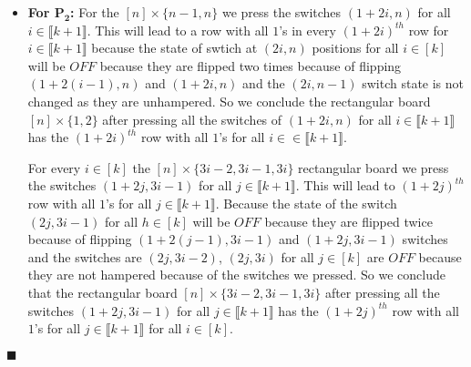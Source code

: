 \documentclass[a4paper, 11pt]{article}
\renewenvironment{proof}{\noindent{\it \textbf{Proof:}}\hspace*{1em}}{\hfill $\blacksquare$\bigskip\\}
\begin{document}
{\begin{proof}
\begin{itemize}
		For every $i\in[k]$ the $[n]\times \{3i,3i+1,3i+2\}$ rectangular board we press the switches $(1+2j,3i+1)$ for all $j\in\llbracket k+1\rrbracket$. This will lead to $({1+2j})^{th}$ row with all $1$'s for all $j\in\llbracket k+1\rrbracket$. Because the state of the switch $(2j,3i+1)$ for all $h\in[k]$ will be $OFF$ because they are flipped twice because of flipping $(1+2(j-1),3i+1)$ and $(1+2j,3i+1)$ switches and the switches are $(2j,3i)$, $(2j,3i+2)$ for all $j\in[k]$ are $OFF$ because they are not hampered because of the switches we pressed. So we conclude that the rectangular board $[n]\times \{3i,3i+1,3i+2\}$ after pressing all the switches  $(1+2j,3i+1)$ for all $j\in\llbracket k+1\rrbracket$ has  the $({1+2j})^{th}$ row with all $1$'s for all $j\in\llbracket k+1\rrbracket$ for all $i\in[k]$.
		
		Flipping a switch in one of the member of $P_1$ doesn't hamper another member because for switches on left or right edge horizontally it just one neighbor at right or left side respectively and for switches in the $n\times 3$ board we are pressing some switches in the middle column. So they don't have effect on each other.  Therefore after in the $n\times n$ board if we press the switches $$S_1=\{(1+2j,1),(1+2j,3i+1)\colon i\in\llbracket k+1\rrbracket,\ j\in[k]\}$$ will lead to $(1+2j)^{th}$ row with all $1$'s for all $j\in\llbracket k+1\rrbracket$. Therefore we have $$\sum_{j=0}^{k+1}\lt[A_{1+2j,1}+ \sum_{i=1}^kA_{1+2j,3i+1}\rt]=J$$
		
		
		\item  \textbf{For $\boldsymbol{P_2}$:} For the $[n]\times \{n-1,n\}$ we press the switches $(1+2i,n)$ for all $i\in\llbracket k+1\rrbracket$. This will lead to a row with all $1$'s in every $(1+2i)^{th}$ row for $i\in\llbracket k+1\rrbracket$ because the state of swtich at $(2i,n)$ positions for all $i\in[k]$ will be $OFF$ because they are flipped two times because of flipping $(1+2(i-1),n)$ and $(1+2i,n)$ and the $(2i,n-1)$ switch state is not changed as they are unhampered.    So we conclude the rectangular board $[n]\times \{1,2\}$ after pressing all the switches of  $(1+2i,n)$ for all $i\in\llbracket k+1\rrbracket$ has the  $(1+2i)^{th}$ row with all $1$'s for all $i\in\in\llbracket k+1\rrbracket$. \parinn
		
		For every $i\in[k]$ the $[n]\times \{3i-2,3i-1,3i\}$ rectangular board we press the switches $(1+2j,3i-1)$ for all $j\in\llbracket k+1\rrbracket$. This will lead to $({1+2j})^{th}$ row with all $1$'s for all $j\in\llbracket k+1\rrbracket$. Because the state of the switch $(2j,3i-1)$ for all $h\in[k]$ will be $OFF$ because they are flipped twice because of flipping $(1+2(j-1),3i-1)$ and $(1+2j,3i-1)$ switches and the switches are $(2j,3i-2)$, $(2j,3i)$ for all $j\in[k]$ are $OFF$ because they are not hampered because of the switches we pressed. So we conclude that the rectangular board $[n]\times \{3i-2,3i-1,3i\}$ after pressing all the switches  $(1+2j,3i-1)$ for all $j\in\llbracket k+1\rrbracket$ has  the $({1+2j})^{th}$ row with all $1$'s for all $j\in\llbracket k+1\rrbracket$ for all $i\in[k]$.
		

\end{itemize}
\end{proof}}
\end{document}
